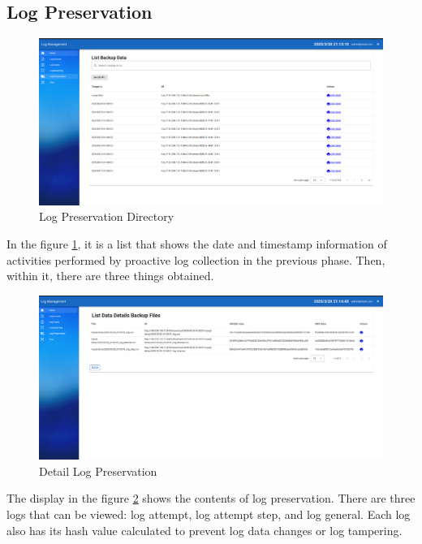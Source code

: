 \subsection{Log Preservation}
\begin{figure}[H] 
	\centering
	\includegraphics[width=14cm]{figure/log_preservation.png}
	\caption{Log Preservation Directory}
	\label{fig:log-preservation-1}
\end{figure}

In the figure \ref{fig:log-preservation-1}, it is a list that shows the date and timestamp information of activities performed by proactive log collection in the previous phase. Then, within it, there are three things obtained.

\begin{figure}[H] 
	\centering
	\includegraphics[width=14cm]{figure/log_preservation_detail.png}
	\caption{Detail Log Preservation}
	\label{fig:log-preservation-2}
\end{figure}

The display in the figure \ref{fig:log-preservation-2} shows the contents of log preservation. There are three logs that can be viewed: log attempt, log attempt step, and log general. Each log also has its hash value calculated to prevent log data changes or log tampering.

